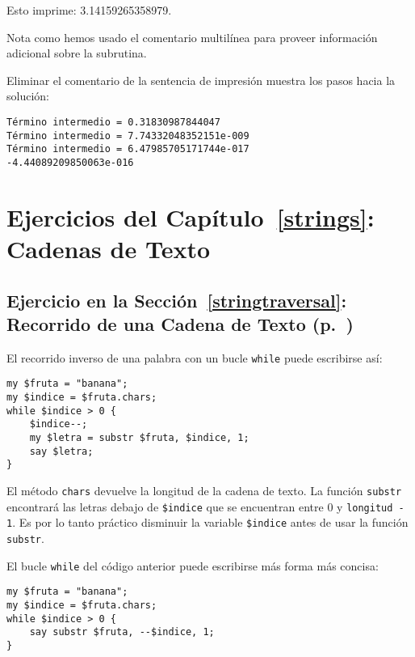Esto imprime: 3.14159265358979.

Nota como hemos usado el comentario multilínea para proveer
información adicional sobre la subrutina.

Eliminar el comentario de la sentencia de impresión muestra 
los pasos hacia la solución:

\begin{verbatim}
Término intermedio = 0.31830987844047
Término intermedio = 7.74332048352151e-009
Término intermedio = 6.47985705171744e-017
-4.44089209850063e-016
\end{verbatim}

\section{Ejercicios del Capítulo~\ref{strings}: Cadenas de Texto}

\subsection{Ejercicio en la Sección~\ref{stringtraversal}: Recorrido de una Cadena de Texto (p.~\pageref{stringtraversal})}
\label{sol_stringtraversal}

El recorrido inverso de una palabra con un bucle {\tt while}
puede escribirse así:

\begin{verbatim}
my $fruta = "banana";
my $indice = $fruta.chars;
while $indice > 0 { 
    $indice--;
    my $letra = substr $fruta, $indice, 1; 
    say $letra; 
}
\end{verbatim}
%

El método {\tt chars} devuelve la longitud de la cadena de texto.
La función {\tt substr} encontrará las letras debajo de \verb|$indice|
que se encuentran entre 0 y \verb|longitud - 1|. Es por lo tanto 
práctico disminuir la variable \verb|$indice| antes de usar la función
{\tt substr}. 

El bucle \verb|while| del código anterior puede escribirse más
forma más concisa:

\begin{verbatim}
my $fruta = "banana";
my $indice = $fruta.chars;
while $indice > 0 { 
    say substr $fruta, --$indice, 1; 
}
\end{verbatim}
%


